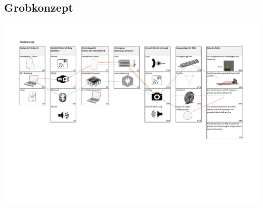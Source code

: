 \begin{landscape}
	\section{Grobkonzept}	
	\includegraphics[page=1,scale=0.825,clip,trim=17mm 75mm 18mm 26mm]{Morphologie/Bilder/Grobkonzept.pdf}
\end{landscape} 

